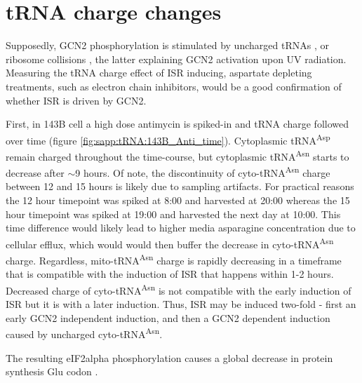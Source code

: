 \FloatBarrier
\section{tRNA charge changes}
Supposedly, GCN2 phosphorylation is stimulated by uncharged tRNAs \cite{Wek1989-yw, Dong2000-si}, or ribosome collisions \cite{Harding2019-kb, Wu2020-lq, Yan2021-yv}, the latter explaining GCN2 activation upon UV radiation.
Measuring the tRNA charge effect of ISR inducing, aspartate depleting treatments, such as electron chain inhibitors, would be a good confirmation of whether ISR is driven by GCN2.

First, in 143B cell a high dose antimycin is spiked-in and tRNA charge followed over time (figure \ref{fig:sapp:tRNA:143B_Anti_time}).
Cytoplasmic tRNA\textsuperscript{Asp} remain charged throughout the time-course, but cytoplasmic tRNA\textsuperscript{Asn} starts to decrease after $\sim$9 hours.
Of note, the discontinuity of cyto-tRNA\textsuperscript{Asn} charge between 12 and 15 hours is likely due to sampling artifacts.
For practical reasons the 12 hour timepoint was spiked at 8:00 and harvested at 20:00 whereas the 15 hour timepoint was spiked at 19:00 and harvested the next day at 10:00.
This time difference would likely lead to higher media asparagine concentration due to cellular efflux, which would would then buffer the decrease in cyto-tRNA\textsuperscript{Asn} charge.
Regardless, mito-tRNA\textsuperscript{Asn} charge is rapidly decreasing in a timeframe that is compatible with the induction of ISR that happens within 1-2 hours.
Decreased charge of cyto-tRNA\textsuperscript{Asn} is not compatible with the early induction of ISR but it is with a later induction.
Thus, ISR may be induced two-fold - first an early GCN2 independent induction, and then a GCN2 dependent induction caused by uncharged cyto-tRNA\textsuperscript{Asn}.





The resulting eIF2alpha phosphorylation causes a global decrease in protein synthesis
Glu codon
.




